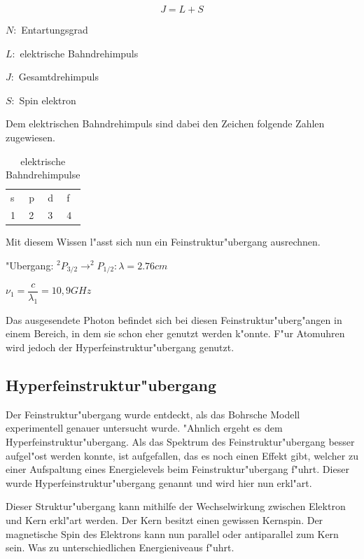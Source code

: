 \begin{refsection}
\begin{equation}
	J = L + S
\end{equation}

$N:$ Entartungsgrad

$L:$ elektrische Bahndrehimpuls

$J:$ Gesamtdrehimpuls

$S:$ Spin elektron

Dem elektrischen Bahndrehimpuls sind dabei den Zeichen folgende Zahlen zugewiesen.

\begin{table}
	\centering	
	\begin{tabular}{llll}
		s & p & d & f \\
		1 & 2 & 3 & 4 \\
	\end{tabular}
	\caption{elektrische Bahndrehimpulse}
	\label{atomuhr:drehimpulsnotation}
\end{table}

Mit diesem Wissen l"asst sich nun ein Feinstruktur"ubergang ausrechnen. 
\begin{center}
		"Ubergang: $^2P_{3/2} \rightarrow ^2P_{1/2}: \lambda = 2.76cm$
		
		$\nu_1 = \dfrac{c}{\lambda_1} = 10,9 GHz $
\end{center}

Das ausgesendete Photon befindet sich bei diesen Feinstruktur"uberg"angen in einem Bereich, in dem sie schon eher genutzt werden k"onnte. F"ur Atomuhren wird jedoch der  Hyperfeinstruktur"ubergang genutzt. 

\subsection{Hyperfeinstruktur"ubergang}
\label{sec:hyperf}
Der Feinstruktur"ubergang wurde entdeckt, als das Bohrsche Modell experimentell genauer untersucht wurde. "Ahnlich ergeht es dem Hyperfeinstruktur"ubergang. Als das Spektrum des Feinstruktur"ubergang besser aufgel"ost werden konnte, ist aufgefallen, das es noch einen Effekt gibt, welcher zu einer Aufspaltung eines Energielevels beim Feinstruktur"ubergang f"uhrt. Dieser wurde Hyperfeinstruktur"ubergang genannt und wird hier nun erkl"art.

Dieser Struktur"ubergang kann mithilfe der Wechselwirkung zwischen Elektron und Kern erkl"art werden. Der Kern besitzt einen gewissen Kernspin. Der magnetische Spin des Elektrons kann nun parallel oder antiparallel zum Kern sein. Was zu unterschiedlichen Energieniveaus f"uhrt. 


\end{refsection}
